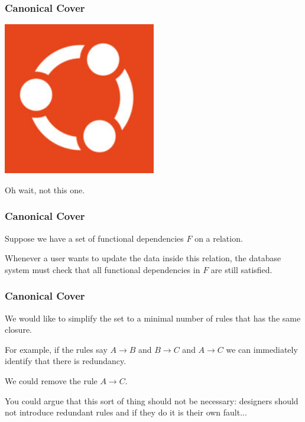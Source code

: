 \begin{frame}
\frametitle{Canonical Cover}

\begin{center}
	\includegraphics[width=0.5\textwidth]{images/canonical.jpg}
\end{center}

Oh wait, not this one.

\end{frame}



\begin{frame}
\frametitle{Canonical Cover}

Suppose we have a set of functional dependencies $F$ on a relation. 

Whenever a user wants to update the data inside this relation, the database system must check that all functional dependencies in $F$ are still satisfied. 

\end{frame}



\begin{frame}
\frametitle{Canonical Cover}

We would like to simplify the set to a minimal number of rules that has the same closure.

For example, if the rules say $A \rightarrow B$ and $B \rightarrow C$ and $A \rightarrow C$ we can immediately identify that there is redundancy. 

We could remove the rule $A \rightarrow C$.

You could argue that this sort of thing should not be necessary: designers should not introduce redundant rules and if they do it is their own fault...

\end{frame}



